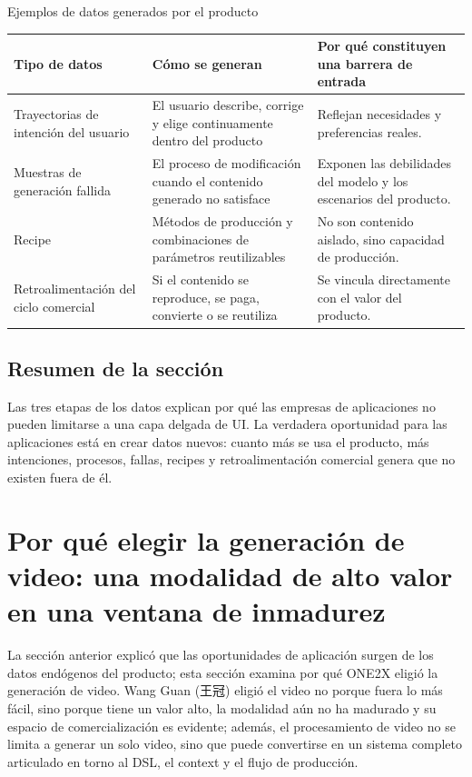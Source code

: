 \documentclass[a4paper]{article}
\begin{document}
\begin{knowledgebox}{Ejemplos de datos generados por el producto}
\begin{tabularx}{\textwidth}{p{}p{}X}
\toprule
Tipo de datos & Cómo se generan & Por qué constituyen una barrera de entrada \\
\midrule
Trayectorias de intención del usuario & El usuario describe, corrige y elige continuamente dentro del producto & Reflejan necesidades y preferencias reales. \\
Muestras de generación fallida & El proceso de modificación cuando el contenido generado no satisface & Exponen las debilidades del modelo y los escenarios del producto. \\
Recipe & Métodos de producción y combinaciones de parámetros reutilizables & No son contenido aislado, sino capacidad de producción. \\
Retroalimentación del ciclo comercial & Si el contenido se reproduce, se paga, convierte o se reutiliza & Se vincula directamente con el valor del producto. \\
\bottomrule
\end{tabularx}
\end{knowledgebox}

\subsection{Resumen de la sección}

Las tres etapas de los datos explican por qué las empresas de aplicaciones no pueden limitarse a una capa delgada de UI. La verdadera oportunidad para las aplicaciones está en crear datos nuevos: cuanto más se usa el producto, más intenciones, procesos, fallas, recipes y retroalimentación comercial genera que no existen fuera de él.
\section{Por qué elegir la generación de video: una modalidad de alto valor en una ventana de inmadurez}

La sección anterior explicó que las oportunidades de aplicación surgen de los datos endógenos del producto; esta sección examina por qué ONE2X eligió la generación de video. Wang Guan (王冠) eligió el video no porque fuera lo más fácil, sino porque tiene un valor alto, la modalidad aún no ha madurado y su espacio de comercialización es evidente; además, el procesamiento de video no se limita a generar un solo video, sino que puede convertirse en un sistema completo articulado en torno al DSL, el context y el flujo de producción.
\end{document}
